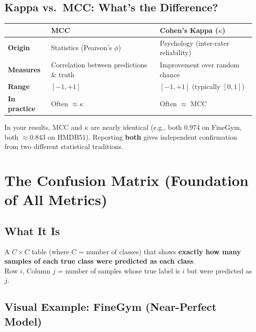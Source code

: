 \documentclass[12pt, a4paper]{article}
\begin{document}
\subsection{Kappa vs.\ MCC: What's the Difference?}

\begin{center}
\begin{tabular}{lll}
\toprule
& \textbf{MCC} & \textbf{Cohen's Kappa ($\kappa$)} \\
\midrule
\textbf{Origin} & Statistics (Pearson's $\phi$) & Psychology (inter-rater reliability) \\
\textbf{Measures} & Correlation between predictions \& truth & Improvement over random chance \\
\textbf{Range} & $[-1, +1]$ & $[-1, +1]$ (typically $[0, 1]$) \\
\textbf{In practice} & Often $\approx \kappa$ & Often $\approx$ MCC \\
\bottomrule
\end{tabular}
\end{center}

In your results, MCC and $\kappa$ are nearly identical (e.g., both 0.974 on FineGym, both $\approx 0.843$ on HMDB51). Reporting \textbf{both} gives independent confirmation from two different statistical traditions.


\newpage
\section{The Confusion Matrix (Foundation of All Metrics)}

\subsection{What It Is}

\begin{keyidea}
A $C \times C$ table (where $C$ = number of classes) that shows \textbf{exactly how many samples of each true class were predicted as each class}.\\[0.3cm]
Row $i$, Column $j$ = number of samples whose true label is $i$ but were predicted as $j$.
\end{keyidea}

\subsection{Visual Example: FineGym (Near-Perfect Model)}
\end{document}
